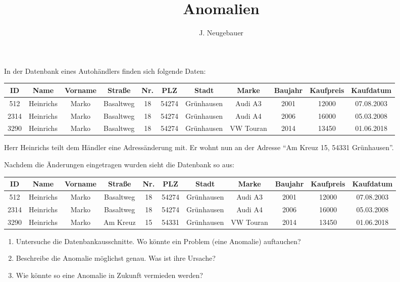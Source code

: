 \documentclass[10pt, a5paper,landscape]{scrartcl}
\author{J. Neugebauer}
\title{Anomalien}
\date{\Heute}
\begin{document}
\ReiheTitel

In der Datenbank eines Autohändlers finden sich folgende Daten:

{\footnotesize
\begin{tabular}{|*{11}{c|}}\hline
	\rowcolor{ngb.tabelle.kopf.hg} ID & Name & Vorname & Straße & Nr. & PLZ & Stadt & Marke & Baujahr & Kaufpreis & Kaufdatum \\ \hline
	512 & Heinrichs & Marko & Basaltweg & 18 & 54274 & Grünhausen & Audi A3 & 2001 & 12000 & 07.08.2003 \\\hline
	2314 & Heinrichs & Marko & Basaltweg & 18 & 54274 & Grünhausen & Audi A4 & 2006 & 16000 & 05.03.2008 \\\hline
	3290 & Heinrichs & Marko & Basaltweg & 18 & 54274 & Grünhausen & VW Touran & 2014 & 13450 & 01.06.2018 \\\hline
\end{tabular}}

Herr Heinrichs teilt dem Händler eine Adressänderung mit. Er wohnt nun an der Adresse \enquote{Am Kreuz 15, 54331 Grünhausen}.

Nachdem die Änderungen eingetragen wurden sieht die Datenbank so aus:

{\footnotesize
\begin{tabular}{|*{11}{c|}}\hline
	\rowcolor{ngb.tabelle.kopf.hg} ID & Name & Vorname & Straße & Nr. & PLZ & Stadt & Marke & Baujahr & Kaufpreis & Kaufdatum \\ \hline
	512 & Heinrichs & Marko & Basaltweg & 18 & 54274 & Grünhausen & Audi A3 & 2001 & 12000 & 07.08.2003 \\\hline
	2314 & Heinrichs & Marko & Basaltweg & 18 & 54274 & Grünhausen & Audi A4 & 2006 & 16000 & 05.03.2008 \\\hline
	3290 & Heinrichs & Marko & Am Kreuz & 15 & 54331 & Grünhausen & VW Touran & 2014 & 13450 & 01.06.2018 \\\hline
\end{tabular}}

\vspace{1em}
\begin{aufgabe}
\begin{enumerate}
	\item Untersuche die Datenbankausschnitte. Wo könnte ein Problem (eine Anomalie) auftauchen?
	\item Beschreibe die Anomalie möglichst genau. Was ist ihre Ursache?
	\item Wie könnte so eine Anomalie in Zukunft vermieden werden?
\end{enumerate}
\end{aufgabe}
\end{document}
